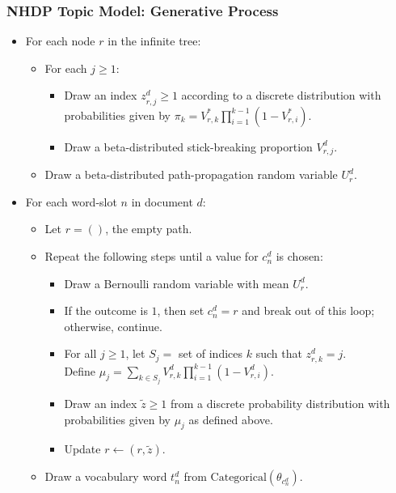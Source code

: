 \documentclass{beamer}
\begin{document}
\begin{frame}
\frametitle{NHDP Topic Model: Generative Process}
  \begin{itemize}[<+->]
  \item For each node $r$ in the infinite tree:
    \begin{itemize}
    \item For each $j \geq 1$:
      \begin{itemize}
      \item Draw an index $z^d_{r,j} \geq 1$ according to a discrete distribution with probabilities given by $\pi_k = V^*_{r,k} \prod_{i=1}^{k-1} (1-V^*_{r,i})$.
      \item Draw a beta-distributed stick-breaking proportion $V^d_{r,j}$.
      \end{itemize}
    \item Draw a beta-distributed path-propagation random variable $U^d_r$.
    \end{itemize}
  \item For each word-slot $n$ in document $d$:
    \begin{itemize}
    \item Let $r = ()$, the empty path.
    \item Repeat the following steps until a value for $c^d_n$ is chosen:
      \begin{itemize}
      \item Draw a Bernoulli random variable with mean $U^d_r$.
      \item If the outcome is $1$, then set $c^d_n = r$ and break out of this loop; otherwise, continue.
      \item For all $j \geq 1$, let $S_j =$ set of indices $k$ such that $z^d_{r,k} = j$. \\
      Define $\mu_j = \sum_{k \in S_j} V^d_{r,k} \prod_{i=1}^{k-1} (1-V^d_{r,i})$.
      \item Draw an index $\tilde z \geq 1$ from a discrete probability distribution with probabilities given by $\mu_j$ as defined above.
      \item Update $r \gets (r, \tilde z)$.
      \end{itemize}
    \item Draw a vocabulary word $t^d_n$ from $\text{Categorical}(\theta_{c^d_n})$.
    \end{itemize}
  \end{itemize}
\end{frame}
\end{document}
